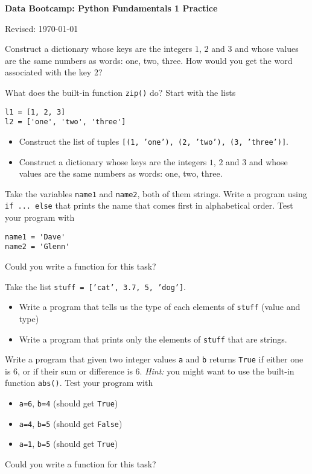 \documentclass[11pt]{exam}
\begin{document}
\parindent=0.0in
\thispagestyle{empty}
%

\bigskip\bigskip
\centerline{\Large \bf Data Bootcamp:  Python Fundamentals 1 Practice}
\centerline{Revised: \today}

\medskip

\vspace{2cm}

\begin{questions}
\item Construct a dictionary whose keys are the integers $1$, $2$ and $3$ and whose values are the same numbers as words: one, two, three. How would you get the word associated with the key 2?  

\item What does the built-in function \texttt{zip()} do? Start with the lists
\begin{verbatim}
l1 = [1, 2, 3]
l2 = ['one', 'two', 'three']
\end{verbatim} 
\begin{itemize}
\item Construct the list of tuples \texttt{[(1, 'one'), (2, 'two'), (3, 'three')]}.
\item Construct a dictionary whose keys are the integers $1$, $2$ and $3$ and whose values are the same numbers as words: one, two, three.  
\end{itemize}

\item Take the variables \texttt{name1} and \texttt{name2}, both of them strings. Write a program using \texttt{if ... else} that prints the name that comes first in alphabetical order. Test your program with 
\begin{verbatim}
name1 = 'Dave'
name2 = 'Glenn'
\end{verbatim}
Could you write a function for this task?

\item Take the list \texttt{stuff = ['cat', 3.7, 5, 'dog']}. 
\begin{itemize}
\item Write a program that tells us the type of each elements of \texttt{stuff} (value and type)
\item Write a program that prints only the elements of \texttt{stuff} that are strings. 
\end{itemize}


\item Write a program that given two integer values \texttt{a} and \texttt{b} returns \texttt{True} if either one is $6$, or if their sum or difference is $6$. \emph{Hint:} you might want to use the built-in function \texttt{abs()}. Test your program with
\begin{itemize}
\item \texttt{a=6}, \texttt{b=4} (should get \texttt{True})
\item \texttt{a=4}, \texttt{b=5} (should get \texttt{False})
\item \texttt{a=1}, \texttt{b=5} (should get \texttt{True})
\end{itemize}
Could you write a function for this task?



\end{questions}
\end{document}
